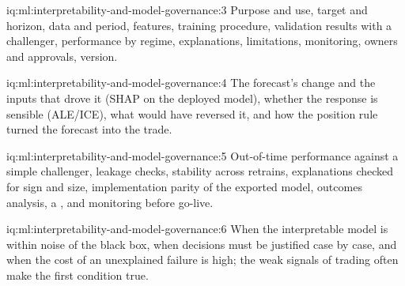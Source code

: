 \begin{solution}{iq:ml:interpretability-and-model-governance:3}
Purpose and use, target and horizon, data and period, features, training procedure, validation results with a challenger,
performance by regime, explanations, limitations, monitoring, owners and approvals, version.
\end{solution}

\begin{solution}{iq:ml:interpretability-and-model-governance:4}
The forecast's change and the inputs that drove it (SHAP on the deployed model), whether the response is sensible (ALE/ICE),
what would have reversed it, and how the position rule turned the forecast into the trade.
\end{solution}

\begin{solution}{iq:ml:interpretability-and-model-governance:5}
Out-of-time performance against a simple challenger, leakage checks, stability across retrains, explanations checked for sign
and size, implementation parity of the exported model, outcomes analysis, a , and monitoring before go-live.
\end{solution}

\begin{solution}{iq:ml:interpretability-and-model-governance:6}
When the interpretable model is within noise of the black box, when decisions must be justified case by case, and when the
cost of an unexplained failure is high; the weak signals of trading often make the first condition true.
\end{solution}
